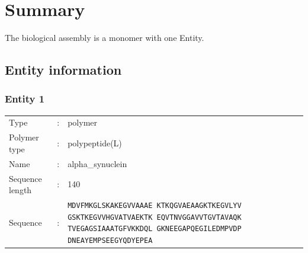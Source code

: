\newpage
\pagestyle{fancy}
\renewcommand{\footrulewidth}{0pt}
\section{Summary}
The biological assembly is a monomer with one Entity.\\
\subsection{ Entity information}
\subsubsection{ Entity 1 }
\begin{longtable}{l l l}
Type &:& polymer\\
Polymer type &:& polypeptide(L)\\
Name &:& alpha\_synuclein\\
Sequence length &:& 140\\
Sequence &:& \multicolumn{1}{p{0.25\linewidth}}{\texttt{MDVFMKGLSKAKEGVVAAAE KTKQGVAEAAGKTKEGVLYV GSKTKEGVVHGVATVAEKTK EQVTNVGGAVVTGVTAVAQK TVEGAGSIAAATGFVKKDQL GKNEEGAPQEGILEDMPVDP DNEAYEMPSEEGYQDYEPEA }}\\
\end{longtable}

